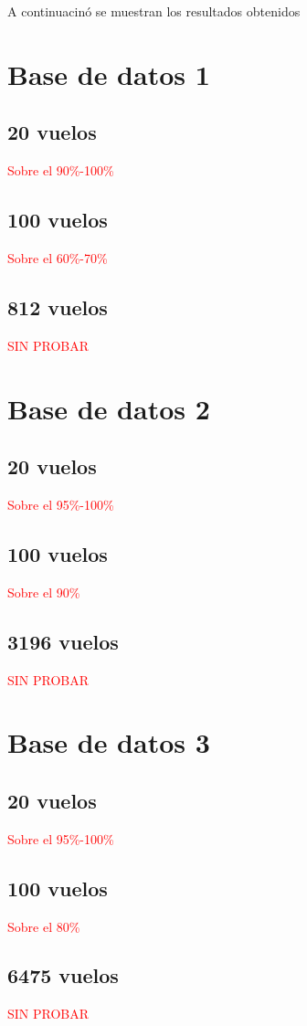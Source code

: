 A continuacinó se muestran los resultados obtenidos



\section{Base de datos 1}
\subsection{20 vuelos}
\textcolor{red}{Sobre el 90\%-100\%}
\subsection{100 vuelos}
\textcolor{red}{Sobre el 60\%-70\%}
\subsection{812 vuelos}
\textcolor{red}{SIN PROBAR}

\section{Base de datos 2}
\subsection{20 vuelos}
\textcolor{red}{Sobre el 95\%-100\%}
\subsection{100 vuelos}
\textcolor{red}{Sobre el 90\%}
\subsection{3196 vuelos}
\textcolor{red}{SIN PROBAR}

\section{Base de datos 3}
\subsection{20 vuelos}
\textcolor{red}{Sobre el 95\%-100\%}
\subsection{100 vuelos}
\textcolor{red}{Sobre el 80\%}
\subsection{6475 vuelos}
\textcolor{red}{SIN PROBAR}
